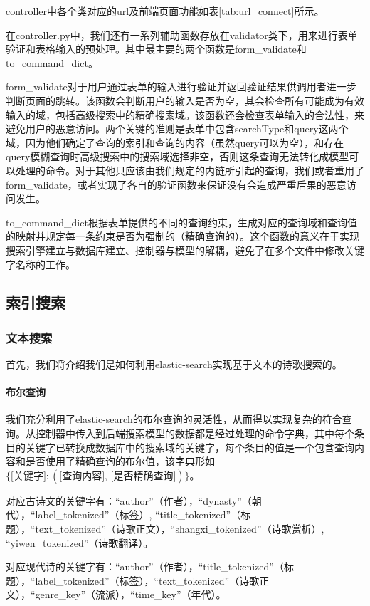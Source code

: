 \documentclass[a4paper, 10pt]{article}
\begin{document}
controller中各个类对应的url及前端页面功能如表\ref{tab:url_connect}所示。

在controller.py中，我们还有一系列辅助函数存放在validator类下，用来进行表单验证和表格输入的预处理。其中最主要的两个函数是form\_validate和to\_command\_dict。

form\_validate对于用户通过表单的输入进行验证并返回验证结果供调用者进一步判断页面的跳转。该函数会判断用户的输入是否为空，其会检查所有可能成为有效输入的域，包括高级搜索中的精确搜索域。该函数还会检查表单输入的合法性，来避免用户的恶意访问。两个关键的准则是表单中包含searchType和query这两个域，因为他们确定了查询的索引和查询的内容（虽然query可以为空），和存在query模糊查询时高级搜索中的搜索域选择非空，否则这条查询无法转化成模型可以处理的命令。对于其他只应该由我们规定的内链所引起的查询，我们或者重用了form\_validate，或者实现了各自的验证函数来保证没有会造成严重后果的恶意访问发生。

to\_command\_dict根据表单提供的不同的查询约束，生成对应的查询域和查询值的映射并规定每一条约束是否为强制的（精确查询的）。这个函数的意义在于实现搜索引擎建立与数据库建立、控制器与模型的解耦，避免了在多个文件中修改关键字名称的工作。

\subsection{索引搜索}

\subsubsection{文本搜索}
首先，我们将介绍我们是如何利用elastic-search实现基于文本的诗歌搜索的。

\paragraph*{布尔查询} 我们充分利用了elastic-search的布尔查询的灵活性，从而得以实现复杂的符合查询。从控制器中传入到后端搜索模型的数据都是经过处理的命令字典，其中每个条目的关键字已转换成数据库中的搜索域的关键字，每个条目的值是一个包含查询内容和是否使用了精确查询的布尔值，该字典形如$\{ \text{[关键字]}: (\text{[查询内容], [是否精确查询]}) \}$。

对应古诗文的关键字有：“author”（作者），“dynasty”（朝代），“label\_tokenized”（标签）, 
“title\_tokenized”（标题），“text\_tokenized”（诗歌正文），“shangxi\_tokenized”（诗歌赏析）, “yiwen\_tokenized”（诗歌翻译）。

对应现代诗的关键字有：“author”（作者），“title\_tokenized”（标题），“label\_tokenized”（标签），“text\_tokenized”（诗歌正文），“genre\_key”（流派），“time\_key”（年代）。
\end{document}
